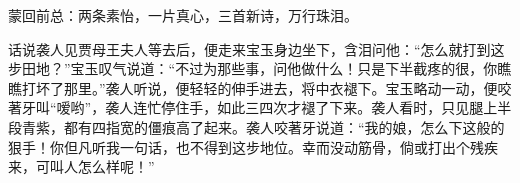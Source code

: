 

\begin{parag}
    \begin{note}蒙回前总：两条素怡，一片真心，三首新诗，万行珠泪。\end{note}
\end{parag}


\begin{parag}
    话说袭人见贾母王夫人等去后，便走来宝玉身边坐下，含泪问他：“怎么就打到这步田地？”宝玉叹气说道：“不过为那些事，问他做什么！只是下半截疼的很，你瞧瞧打坏了那里。”袭人听说，便轻轻的伸手进去，将中衣褪下。宝玉略动一动，便咬著牙叫“嗳哟”，袭人连忙停住手，如此三四次才褪了下来。袭人看时，只见腿上半段青紫，都有四指宽的僵痕高了起来。袭人咬著牙说道：“我的娘，怎么下这般的狠手！你但凡听我一句话，也不得到这步地位。幸而没动筋骨，倘或打出个残疾来，可叫人怎么样呢！”
\end{parag}


